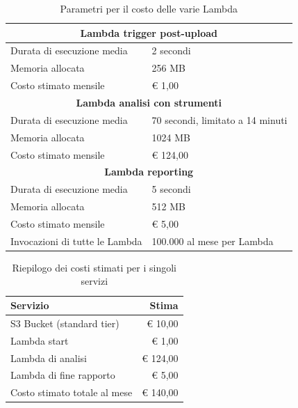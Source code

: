 \begin{table}[H]
\centering
\begin{tabular}{|ll|}
\hline
\multicolumn{2}{|c|}{\textbf{Lambda trigger post-upload}}                               \\ \hline
\multicolumn{1}{|l|}{Durata di esecuzione media}     & 2 secondi                        \\
\multicolumn{1}{|l|}{Memoria allocata}               & 256 MB                           \\
\multicolumn{1}{|l|}{Costo stimato mensile}          & € 1,00                           \\ \hline
\multicolumn{2}{|c|}{\textbf{Lambda analisi con strumenti}}                             \\ \hline
\multicolumn{1}{|l|}{Durata di esecuzione media}     & 70 secondi, limitato a 14 minuti \\
\multicolumn{1}{|l|}{Memoria allocata}               & 1024 MB                          \\
\multicolumn{1}{|l|}{Costo stimato mensile}          & € 124,00                         \\ \hline
\multicolumn{2}{|c|}{\textbf{Lambda reporting}}                                         \\ \hline
\multicolumn{1}{|l|}{Durata di esecuzione media}     & 5 secondi                        \\
\multicolumn{1}{|l|}{Memoria allocata}               & 512 MB                           \\
\multicolumn{1}{|l|}{Costo stimato mensile}          & € 5,00                           \\ \hline
\multicolumn{1}{|l|}{Invocazioni di tutte le Lambda} & 100.000 al mese per Lambda       \\ \hline
\end{tabular}
\label{tab:aws_lambdas_costs}
\caption{Parametri per il costo delle varie Lambda}
\end{table}

\begin{table}[H]
    \centering
    \begin{tabular}{|l|r|}
        \hline
        \textbf{Servizio}            & \textbf{Stima} \\ \hline
        S3 Bucket (standard tier)    & € 10,00        \\
        Lambda start                 & € 1,00         \\
        Lambda di analisi            & € 124,00       \\
        Lambda di fine rapporto      & € 5,00         \\ \hline
        Costo stimato totale al mese & € 140,00       \\ \hline
    \end{tabular}
    \label{tab:aws_summary_costs}
    \caption{Riepilogo dei costi stimati per i singoli servizi}
\end{table}

